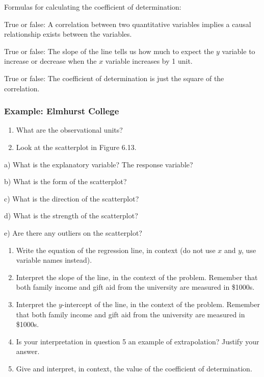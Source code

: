 \documentclass[
]{report}
\newcommand{\rgs}{\vspace{12pt}} %
\newcommand{\rgi}{\hspace{24pt}}  %
\begin{document}
Formulas for calculating the coefficient of determination:
\rgs

True or false: A correlation between two quantitative variables implies a causal relationship exists between the variables.

True or false: The slope of the line tells us how much to expect the \(y\) variable to increase or decrease when the \(x\) variable increases by 1 unit.

True or false: The coefficient of determination is just the square of the correlation.

\hypertarget{example-elmhurst-college}{%
\subsubsection*{Example: Elmhurst College}\label{example-elmhurst-college}}

\begin{enumerate}
\def\labelenumi{\arabic{enumi}.}
\item
  What are the observational units?\\
  \rgs
\item
  Look at the scatterplot in Figure 6.13.
\end{enumerate}

\rgi a) What is the explanatory variable? The response variable?\\
\rgs

\rgi b) What is the form of the scatterplot?\\
\rgs

\rgi c) What is the direction of the scatterplot?
\rgs

\rgi d) What is the strength of the scatterplot?
\rgs

\rgi e) Are there any outliers on the scatterplot?\\
\rgs

\begin{enumerate}
\def\labelenumi{\arabic{enumi}.}
\setcounter{enumi}{2}
\item
  Write the equation of the regression line, in context (do not use \(x\) and \(y\), use variable names instead).
  \rgs
\item
  Interpret the slope of the line, in the context of the problem. Remember that both family income and gift aid from the university are measured in \$1000s.
  \rgs
  \rgs
\item
  Interpret the \(y\)-intercept of the line, in the context of the problem. Remember that both family income and gift aid from the university are measured in \$1000s.
  \rgs
  \rgs
\item
  Is your interpretation in question 5 an example of extrapolation? Justify your answer.
  \rgs
\item
  Give and interpret, in context, the value of the coefficient of determination.
  \rgs
  \rgs
\end{enumerate}
\end{document}
